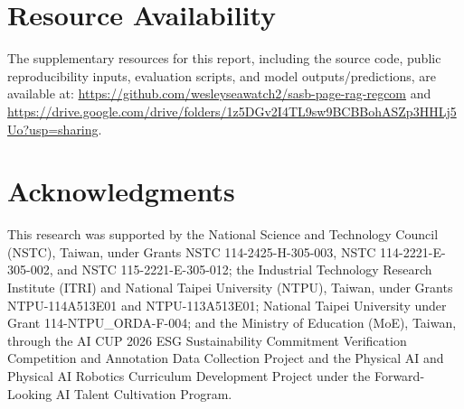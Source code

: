 \documentclass[sigconf,article]{acmart}
\begin{document}
\section*{Resource Availability}
The supplementary resources for this report, including the source code, public reproducibility inputs, evaluation scripts, and model outputs/predictions, are available at:
\url{https://github.com/wesleyseawatch2/sasb-page-rag-regcom} and
\url{https://drive.google.com/drive/folders/1z5DGv2I4TL9sw9BCBBohASZp3HHLj5Uo?usp=sharing}.

\section*{Acknowledgments}
This research was supported by the National Science and Technology Council (NSTC), Taiwan, under Grants NSTC 114-2425-H-305-003, NSTC 114-2221-E-305-002, and NSTC 115-2221-E-305-012; the Industrial Technology Research Institute (ITRI) and National Taipei University (NTPU), Taiwan, under Grants NTPU-114A513E01 and NTPU-113A513E01; National Taipei University under Grant 114-NTPU\_ORDA-F-004; and the Ministry of Education (MoE), Taiwan, through the AI CUP 2026 ESG Sustainability Commitment Verification Competition and Annotation Data Collection Project and the Physical AI and Physical AI Robotics Curriculum Development Project under the Forward-Looking AI Talent Cultivation Program.



\end{document}
